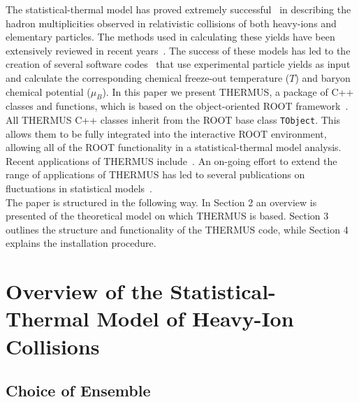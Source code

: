 \documentclass{elsarticle}
\begin{document}
The statistical-thermal model has proved extremely successful~\cite{Andronic:2005yp,Cleymans:2005xv,Becattini:2005xt}
in describing the hadron multiplicities observed in relativistic collisions of both heavy-ions and elementary particles.
The methods used in calculating these yields have been extensively reviewed in recent 
years~\cite{Becattini:2008yn,BraunMunzinger:2003zd}.  The success of these models has led to the creation 
of several software codes~\cite{Torrieri:2004zz,Torrieri:2006xi,Kisiel:2005hn} that use 
experimental particle yields as input and calculate the corresponding chemical
freeze-out temperature ($T$)  and baryon chemical potential ($\mu_B$).
In this paper we present THERMUS, a package of C++ classes 
and functions, which is based on 
the object-oriented  ROOT framework~\cite{Brun:1997pa}.  All THERMUS C++ classes inherit from the ROOT base class \texttt{TObject}. This
allows them to be fully integrated into the interactive ROOT environment, allowing all of the 
ROOT functionality in a statistical-thermal model analysis. Recent applications of 
THERMUS include~\cite{Cleymans:2005xv,Cleymans:2006xj,Kraus:2006yb,Caines:2006vd,Stiles:2006sa,Takahashi:2007bh,Murray:2007cy,Gorenstein:2007mw,Witt:2007xa,Hippolyte:2006ra,Cleymans:2007uk}.
An on-going effort to extend the range of applications of THERMUS has led to several publications on 
fluctuations in statistical models~\cite{Hauer:2007ju,Gorenstein:2007ep,Begun:2006uu}.\\

The paper is structured in the following way. In Section 2 an overview is presented of the theoretical model on which 
THERMUS is based. Section 3 outlines the structure and functionality of the THERMUS code, while Section 4 explains 
the installation procedure.\\

\section{Overview of the Statistical-Thermal Model of Heavy-Ion Collisions}

\subsection{Choice of Ensemble}
                
\end{document}
